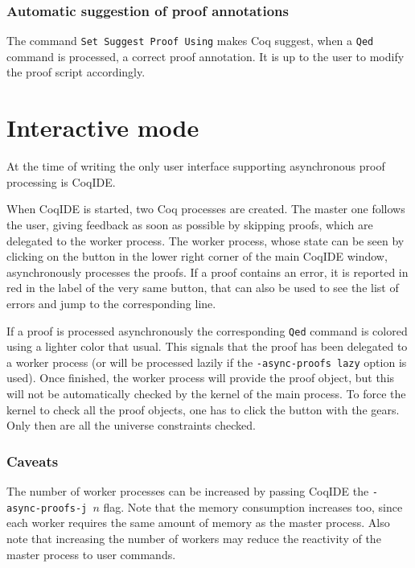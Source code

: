 \subsubsection{Automatic suggestion of proof annotations}

The command \texttt{Set Suggest Proof Using} makes Coq suggest, when a
\texttt{Qed} command is processed, a correct proof annotation. It is up
to the user to modify the proof script accordingly.

\section{Interactive mode}

At the time of writing the only user interface supporting asynchronous proof
processing is CoqIDE.

When CoqIDE is started, two Coq processes are created.  The master one follows
the user, giving feedback as soon as possible by skipping proofs, which are
delegated to the worker process.  The worker process, whose state can be seen
by clicking on the button in the lower right corner of the main CoqIDE window,
asynchronously processes the proofs.  If a proof contains an error, it is
reported in red in the label of the very same button, that can also be used to
see the list of errors and jump to the corresponding line.

If a proof is processed asynchronously the corresponding \texttt{Qed} command
is colored using a lighter color that usual.  This signals that
the proof has been delegated to a worker process (or will be processed
lazily if the \texttt{-async-proofs lazy} option is used). Once finished, the
worker process will provide the proof object, but this will not be
automatically checked by the kernel of the main process. To force
the kernel to check all the proof objects, one has to click the button
with the gears. Only then are all the universe constraints checked.

\subsubsection{Caveats}

The number of worker processes can be increased by passing CoqIDE the
\texttt{-async-proofs-j $n$} flag.  Note that the memory consumption
increases too, since each worker requires the same amount of memory as
the master process. Also note that increasing the number of workers may
reduce the reactivity of the master process to user commands.

